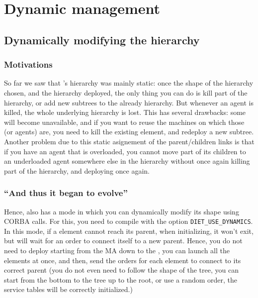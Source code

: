\chapter{Dynamic management}
\label{ch:dynamic}

\section{Dynamically modifying the hierarchy}

\subsection{Motivations}

So far we saw that \diet's hierarchy was mainly static: once the shape
of the hierarchy chosen, and the hierarchy deployed, the only thing
you can do is kill part of the hierarchy, or add new subtrees to the
already hierarchy. But whenever an agent is killed, the whole
underlying hierarchy is lost. This has several drawbacks: some \sed
will become unavailable, and if you want to reuse the machines on
which those \sed (or agents) are, you need to kill the existing \diet
element, and redeploy a new subtree. Another problem due to this
static asignement of the parent/children links is that if you have an
agent that is overloaded, you cannot move part of its children to an
underloaded agent somewhere else in the hierarchy without once again
killing part of the hierarchy, and deploying once again.


\subsection{``And thus it began to evolve''}

Hence, \diet also has a mode in which you can dynamically modify its
shape using CORBA calls. For this, you need to compile \diet with the
option \texttt{DIET\_USE\_DYNAMICS}. In this mode, if a \diet element
cannot reach its parent, when initializing, it won't exit, but will
wait for an order to connect itself to a new parent. Hence, you do not
need to deploy \diet starting from the MA down to the \sed, you can
launch all the elements at once, and then, send the orders for each
element to connect to its correct parent (you do not even need to
follow the shape of the tree, you can start from the bottom to the
tree up to the root, or use a random order, the service tables will be
correctly initialized.)


